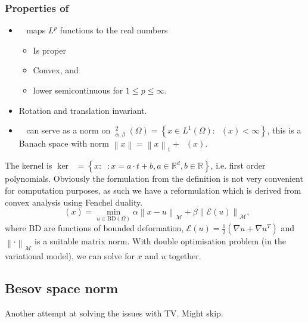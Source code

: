 \documentclass[12pt]{article}
\theoremstyle{definition}
\newcommand{\real}{\mathbb{R}}   %
\newcommand{\set}[1]{\left\{#1\right\}}
\DeclareMathOperator{\TGV}{TGV^2_{\alpha,\beta}}
\DeclareMathOperator{\BGV}{BGV^2_{\alpha,\beta}}
\newcommand\norm[1]{\left\lVert#1\right\rVert}
\begin{document}
\subsubsection{Properties of $\TGV$}
\begin{itemize}
    \item $\TGV$ maps $L^p$ functions to the real numbers
    \begin{itemize}
        \item Is proper
        \item Convex, and
        \item lower semicontinuous for $1\leq p\leq \infty$.
    \end{itemize}
    \item Rotation and translation invariant.
    \item $\TGV$ can serve as a norm on $\BGV^2_{\alpha,\beta}(\Omega) = \set{x\in L^1(\Omega): \TGV(x)<\infty}$, this is a Banach space with norm $\norm{x} = \norm{x}_1+\TGV(x)$.
\end{itemize}

The kernel is $\ker \TGV = \set{x:\BGV : x=a\cdot t+b, a\in \real^d, b\in\real}$, i.e. first order polynomials. Obviously the formulation from the definition is not very convenient for computation purposes, as such we have a reformulation which is derived from convex analysis using Fenchel duality.
\begin{equation*}
    \TGV(x) = \min_{u\in\text{BD}(\Omega)} \alpha\norm{x-u}_\mathcal{M} + \beta \norm{\mathcal{E}(u)}_\mathcal{M},
\end{equation*} 
where BD are functions of bounded deformation, $\mathcal{E}(u)=\frac{1}{2}(\nabla u + \nabla u^T)$ and $\norm{\cdot}_\mathcal{M}$ is a suitable matrix norm. With double optimisation problem (in the variational model), we can solve for $x$ and $u$ together.

\subsection{Besov space norm}
Another attempt at solving the issues with TV. Might skip.
\end{document}
